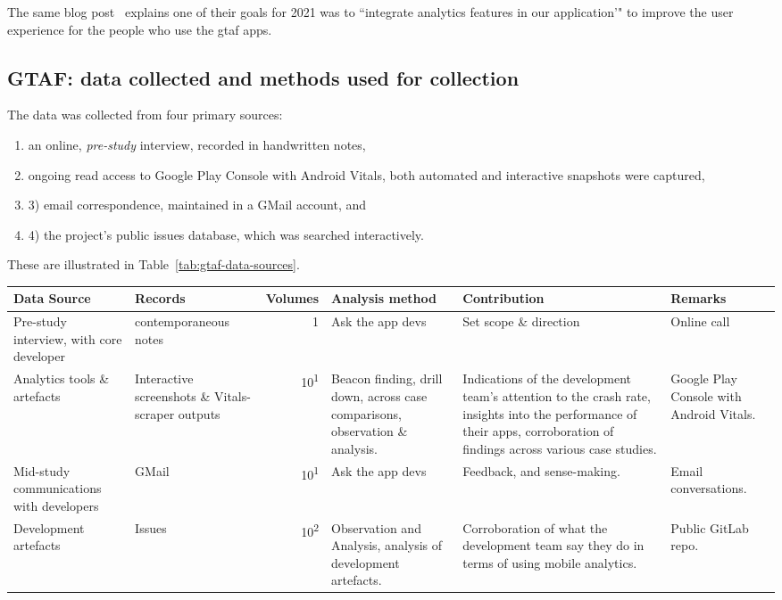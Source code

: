 The same blog post~ explains one of their goals for 2021 was to ``integrate analytics features in our application'" to improve the user experience for the people who use the \acrshort{gtaf} apps.

\subsection{GTAF: data collected and methods used for collection}
The data was collected from four primary sources: 
{\small
\begin{enumerate}
    \itemsep0em
    \item an online, \textit{pre-study} interview, recorded in handwritten notes, 
    \item ongoing read access to Google Play Console with Android Vitals, both automated and interactive snapshots were captured, 
    \item 3) email correspondence, maintained in a GMail account, and 
    \item 4) the project's public issues database, which was searched interactively. 
\end{enumerate}
}
These are illustrated in Table~\ref{tab:gtaf-data-sources}.


\begin{table*}
    \centering
    \footnotesize
    \tabcolsep=0.12cm
    \begin{tabular}{p{2.4cm}p{2.4cm}r>{\raggedright}p{2.4cm}>{\raggedright}p{3cm}>{\raggedright\arraybackslash}p{2.5cm}}
        Data Source & Records & Volumes & Analysis method &Contribution & Remarks \\
        \toprule
         Pre-study interview, with core developer & contemporaneous notes\footnotemark & 1 & Ask the app devs & Set scope \& direction & Online call \\
         Analytics tools \& artefacts &Interactive screenshots \& Vitals-scraper outputs &10\textsuperscript{1} & Beacon finding, drill down, across case comparisons, observation \& analysis. & Indications of the development team's attention to the crash rate, insights into the performance of their apps, corroboration of findings across various case studies. & Google Play Console with Android Vitals. \\         
         Mid-study communications with developers & GMail & 10\textsuperscript{1} & Ask the app devs & Feedback, and sense-making.  & Email conversations. \\
         Development artefacts  & Issues & 10\textsuperscript{2} & Observation and Analysis, analysis of development artefacts. & Corroboration of what the development team say they do in terms of using mobile analytics. & Public GitLab repo. \\
         \bottomrule
    \end{tabular}
    \caption{GTAF: data sources}
    \label{tab:gtaf-data-sources}
\end{table*}



